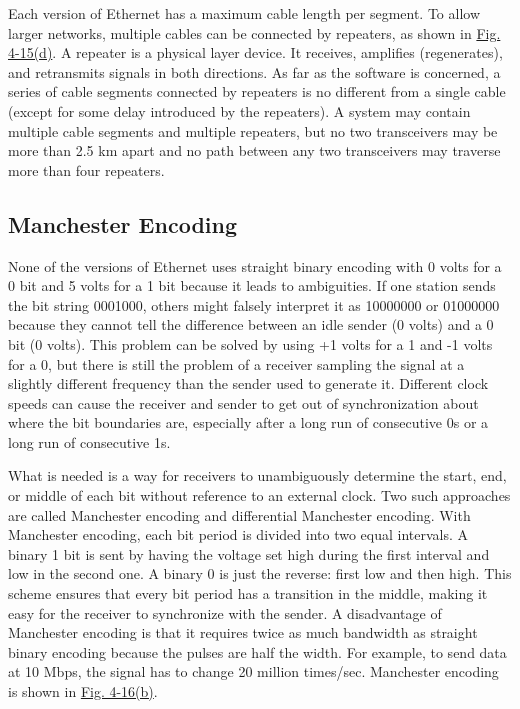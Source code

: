 \documentclass[b5paper,11pt]{memoir}
\begin{document}

Each version of Ethernet has a maximum cable length per segment. To
allow larger networks, multiple cables can be connected by {repeaters},
as shown in
\protect\hyperlink{0130661023_ch04lev1sec3.htmlux5cux23ch04fig15}{Fig.
4-15(d)}. A repeater is a physical layer device. It receives, amplifies
(regenerates), and retransmits signals in both directions. As far as the
software is concerned, a series of cable segments connected by repeaters
is no different from a single cable (except for some delay introduced by
the repeaters). A system may contain multiple cable segments and
multiple repeaters, but no two transceivers may be more than 2.5 km
apart and no path between any two transceivers may traverse more than
four repeaters.

\protect\hypertarget{0130661023_ch04lev1sec3.htmlux5cux23ch04lev2sec10}{}{}

\subsection{Manchester Encoding}

None of the versions of Ethernet uses straight binary encoding with 0
volts for a 0 bit and 5 volts for a 1 bit because it leads to
ambiguities. If one station sends the bit string 0001000, others might
falsely interpret it as 10000000 or 01000000 because they cannot tell
the difference between an idle sender (0 volts) and a 0 bit (0 volts).
This problem can be solved by using +1 volts for a 1 and -1 volts for a
0, but there is still the problem of a receiver sampling the signal at a
slightly different frequency than the sender used to generate it.
Different clock speeds can cause the receiver and sender to get out of
synchronization about where the bit boundaries are, especially after a
long run of consecutive 0s or a long run of consecutive 1s.

What is needed is a way for receivers to unambiguously determine the
start, end, or middle of each bit without reference to an external
clock. Two such approaches are called {Manchester encoding} and
{differential Manchester encoding}. With Manchester encoding, each bit
period is divided into two equal intervals. A binary 1 bit is sent by
having the voltage set high during the first interval and low in the
second one. A binary 0 is just the reverse: first low and then high.
This scheme ensures that every bit period has a transition in the
middle, making it easy for the receiver to synchronize with the sender.
A disadvantage of Manchester encoding is that it requires twice as much
bandwidth as straight binary encoding because the pulses are half the
width. For example, to send data at 10 Mbps, the signal has to change 20
million times/sec. Manchester encoding is shown in
\protect\hyperlink{0130661023_ch04lev1sec3.htmlux5cux23ch04fig16}{Fig.
4-16(b)}.
\end{document}
